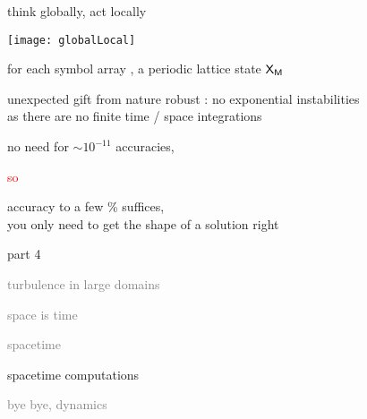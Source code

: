 \begin{frame}{think globally, act locally}
    \begin{center}
\texttt{[image: globalLocal]}
    \end{center}
for each symbol array \Mm, a periodic lattice state $\mathsf{X}_{\mathsf{M}}$
\end{frame}

\begin{frame}{unexpected gift from nature}
robust : no exponential instabilities
\\
\hfill as there are no finite time / space integrations
\bigskip

no need for $\sim
10^{-11}$ accuracies,
\bigskip

{\huge \textcolor{red}{so}}
\bigskip

accuracy to a few \% suffices, \\
\hfill you only need to get the shape of a solution right
\end{frame}

\begin{frame}{part 4}
\begin{enumerate}
              \item
    \textcolor{gray}{\small
turbulence in large domains
              \item
space is time
              \item
spacetime    }
              \item {\Large
spacetime computations
    }\textcolor{gray}{\small
              \item
bye bye, dynamics
                    }
            \end{enumerate}
\end{frame}


